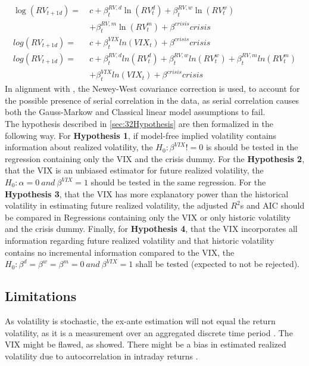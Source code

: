 \begin{align}
\log(RV_{t+1d}) = \ &c + \beta^{RV,d}_{t} \ln(RV^{d}_{t}) + \beta^{RV,w}_{t} \ln(RV^{w}_{t}) \nonumber \\
& + \beta^{RV,m}_{t} \ln(RV^{m}_{t}) + \beta^{crisis} crisis  \tag{Reg1b}  \label{eq:Reg1b}\\
log(RV_{t+1d}) =  \ &c + \beta^{VIX}_{t} ln(VIX_{t}) + \beta^{crisis} crisis  \tag{Reg2b}  \label{eq:Reg2b}\\
log(RV_{t+1d}) = \ &c + \beta^{RV,d}_{t} ln(RV^{d}_{t}) + \beta^{RV,w}_{t} ln(RV^{w}_{t}) + \beta^{RV,m}_{t} ln(RV^{m}_{t}) \nonumber \\
& + \beta^{VIX}_{t} ln(VIX_{t})+ \beta^{crisis} crisis  \tag{Reg3b}  \label{eq:Reg3b}
\end{align}
In alignment with \textcite{corsi2009}, the Newey-West covariance correction is used, to account for the possible presence of serial correlation in the data, as serial correlation causes both the Gauss-Markow and Classical linear model assumptions to fail. \\
The hypothesis described in \ref{sec:32Hypothesis} are then formalized in the following way. For \textbf{Hypothesis 1}, if model-free implied volatility contains information about realized volatility, the $H_{0}: \beta^{VIX} != 0$ is should be tested in the regression containing only the VIX and the crisis dummy. For the \textbf{Hypothesis 2}, that the VIX is an unbiased estimator for future realized volatility, the $H_{0}: \alpha = 0 \ and \ \beta^{VIX} = 1$ should be tested in the same regression. For the \textbf{Hypothesis 3}, that the VIX has more explanatory power than the historical volatility in estimating future realized volatility, the adjusted $R^{2}$s and AIC should be compared in Regressions containing only the VIX or only historic volatility and the crisis dummy. Finally, for \textbf{Hypothesis 4}, that the VIX incorporates all information regarding future realized volatility and that historic volatility contains no incremental information compared to the VIX, the $H_{0}: \beta^{d} = \beta^{w} = \beta^{m} = 0 \ and \ \beta^{VIX} = 1$ shall be tested (expected to not be rejected). 



\subsection{Limitations}\label{sec:43Limits}
As volatility is stochastic, the ex-ante estimation will not equal the return volatility, as it is a measurement over an aggregated discrete time period \parencite{andersen2001}.
The VIX might be flawed, as \textcite{jiang2007} showed.
There might be a bias in estimated realized volatility due to autocorrelation in intraday returns \parencite{jiang2003}. 
